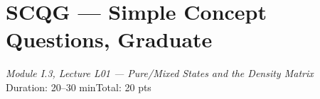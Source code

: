 \documentclass[11pt,a4paper]{article}
\begin{document}
\section*{SCQG --- Simple Concept Questions, Graduate}
\begin{center}
  \textit{Module I.3, Lecture L01 --- Pure/Mixed States and the Density Matrix}\\[4pt]
  \quad{}
  \qquad Duration: 20--30 min\qquad Total: 20 pts
\end{center}


\bigskip

\end{document}
